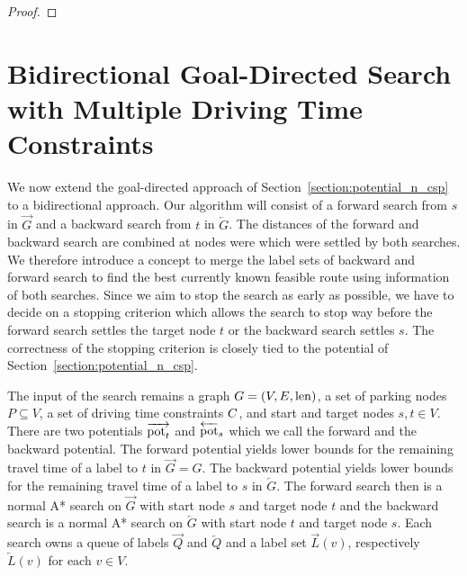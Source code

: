 \begin{proof}
\end{proof}

\section{Bidirectional Goal-Directed Search with Multiple Driving Time Constraints\label{sec:bidir_astar}}
We now extend the goal-directed approach of Section~\ref{section:potential_n_csp} to a bidirectional approach. Our algorithm will consist of a forward search from $s$ in $\overrightarrow{G}$ and a backward search from $t$ in $\overleftarrow{G}$. The distances of the forward and backward search are combined at nodes were which were settled by both searches. We therefore introduce a concept to merge the label sets of backward and forward search to find the best currently known feasible route using information of both searches. Since we aim to stop the search as early as possible, we have to decide on a stopping criterion which allows the search to stop way before the forward search settles the target node $t$ or the backward search settles $s$. The correctness of the stopping criterion is closely tied to the potential of Section~\ref{section:potential_n_csp}.

The input of the search remains a graph $G=(V,E,\operatorname{len})$, a set of parking nodes $P \subseteq V$, a set of driving time constraints $C$, and start and target nodes $s,t \in V$. There are two potentials $\overrightarrow{\operatorname{pot}_t}$ and $\overleftarrow{\operatorname{pot}}_s$ which we call the forward and the backward potential. The forward potential yields lower bounds for the remaining travel time of a label to $t$ in $\overrightarrow{G}=G$. The backward potential yields lower bounds for the remaining travel time of a label to $s$ in $\overleftarrow{G}$. The forward search then is a normal A* search on $\overrightarrow{G}$ with start node $s$ and target node $t$ and the backward search is a normal A* search on $\overleftarrow{G}$ with start node $t$ and target node $s$. Each search owns a queue of labels $\overrightarrow{Q}$ and $\overleftarrow{Q}$ and a label set $\overrightarrow{L}(v)$, respectively $\overleftarrow{L}(v)$ for each $v \in V$.

